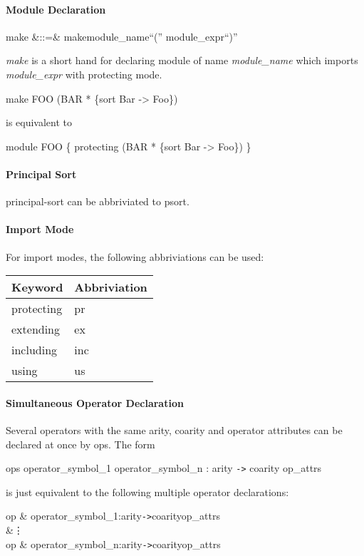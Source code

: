 \documentclass[a4paper]{article}
\def\sym#1{\textsf{#1}\null}
\def\nonterm#1{\textit{#1}\null}
\begin{document}
\paragraph{Module Declaration}
\begin{syntax}
  make &::=& \sym{make}\;module\_name\;\sym{``(''}\; module\_expr\;\sym{``)''}
\end{syntax}
\nonterm{make} is a short hand for declaring module of
name \nonterm{module\_name} which imports \nonterm{module\_expr} with 
protecting mode. 
\begin{example}
  make FOO (BAR * \{sort Bar -> Foo\})
\end{example}
is equivalent to
\begin{example}
  module FOO \{ protecting (BAR * \{sort Bar -> Foo\}) \}
\end{example}

\paragraph{Principal Sort}
\sym{principal-sort} can be abbriviated to \sym{psort}.

\paragraph{Import Mode}
For import modes, the following abbriviations can be used:
\begin{center}
  \begin{tabular}{ll}\hline
    Keyword & Abbriviation \\\hline
    \sym{protecting} & \sym{pr} \\
    \sym{extending} & \sym{ex} \\
    \sym{including} & \sym{inc} \\
    \sym{using} & \sym{us} \\\hline
  \end{tabular}
\end{center}

\paragraph{Simultaneous Operator Declaration}
Several operators with the same arity, coarity and operator attributes 
can be declared at once by \sym{ops}.
The form
\begin{syntax}
  \sym{ops}\; operator\_symbol_1 \cdots operator\_symbol_n\;
  :\; arity\; \verb|->|\; coarity\; op\_attrs
\end{syntax}
is just equivalent to the following multiple operator declarations:
\begin{syntax}
\sym{op}\; & operator\_symbol_1\;:\;arity\;\verb|->|\;coarity\;op\_attrs 
\\
&\vdots\\
\sym{op}\; & operator\_symbol_n\;:\;arity\;\verb|->|\;coarity\;op\_attrs 
\end{syntax}
\end{document}
